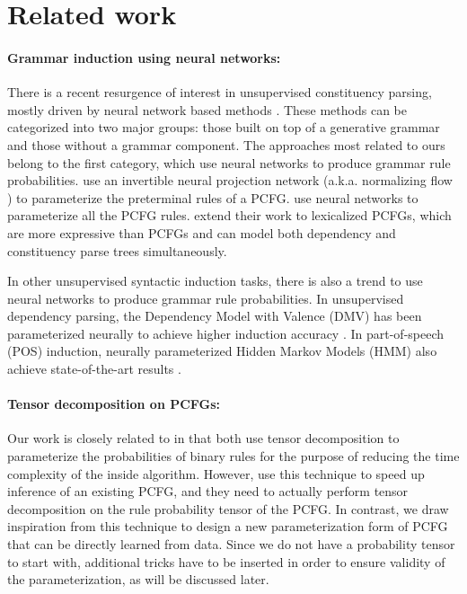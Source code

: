 \documentclass[11pt]{article}
\begin{document}
\section{Related work}\label{sec:related}
\paragraph{Grammar induction using neural networks:} There is a recent resurgence of interest in unsupervised constituency parsing, mostly driven by neural network based methods  \cite{shen2018neural,shen2018ordered,drozdov-etal-2019-unsupervised, drozdov-etal-2020-unsupervised, kim-etal-2019-compound, kim-etal-2019-unsupervised,jin-etal-2019-unsupervised,zhu2020return}. These methods can be categorized into two major groups: those built on top of a generative grammar and those without a grammar component. The approaches most related to ours belong to the first category, which use neural networks to produce grammar rule probabilities. \citet{jin-etal-2019-unsupervised} use an invertible neural projection network (a.k.a. normalizing flow \cite{DBLP:conf/icml/RezendeM15}) to parameterize the preterminal rules of a PCFG. 
\citet{kim-etal-2019-compound} use neural networks to parameterize all the PCFG rules. \citet{zhu2020return} extend their work to lexicalized PCFGs, which are more expressive than PCFGs and can model both dependency and constituency parse trees simultaneously.

In other unsupervised syntactic induction tasks, there is also a trend to use neural networks to produce grammar rule probabilities. In unsupervised dependency parsing, the Dependency Model with Valence (DMV) \cite{klein-manning-2004-corpus} has been parameterized neurally to achieve higher induction accuracy \cite{jiang-etal-2016-unsupervised, songlin2020second}. In part-of-speech (POS) induction, neurally parameterized Hidden Markov Models (HMM) also achieve state-of-the-art results \cite{tran-etal-2016-unsupervised, he-etal-2018-unsupervised}.

\paragraph{Tensor decomposition on PCFGs:} Our work is closely related to \citet{cohen-etal-2013-approximate} in that both use tensor decomposition to parameterize the probabilities of binary rules for the purpose of reducing the time complexity of the inside algorithm. However, \citet{cohen-etal-2013-approximate} use this technique to speed up inference of an existing PCFG, and they need to actually perform tensor decomposition on the rule probability tensor of the PCFG.
In contrast, we draw inspiration from this technique to design a new parameterization form of PCFG that can be directly learned from data. Since we do not have a probability tensor to start with, additional tricks have to be inserted in order to ensure validity of the parameterization, as will be discussed later.
\end{document}
